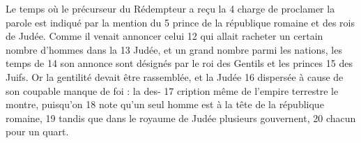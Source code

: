Le temps où le précurseur du Rédempteur a reçu la	 
4	 	charge de proclamer la parole est indiqué par la mention du	 
5	 	prince de la république romaine et des rois de Judée. Comme il venait annoncer celui	 
12	 	qui allait racheter un certain nombre d'hommes dans la	 
13	 	Judée, et un grand nombre parmi les nations, les temps de	 
14	 	son annonce sont désignés par le roi des Gentils et les princes	 
15	 	des Juifs. Or la gentilité devait être rassemblée, et la Judée	 
16	 	dispersée à cause de son coupable manque de foi : la des-	 
17	 	cription même de l'empire terrestre le montre, puisqu'on	 
18	 	note qu'un seul homme est à la tête de la république romaine,	 
19	 	tandis que dans le royaume de Judée plusieurs gouvernent,	 
20	 	chacun pour un quart.